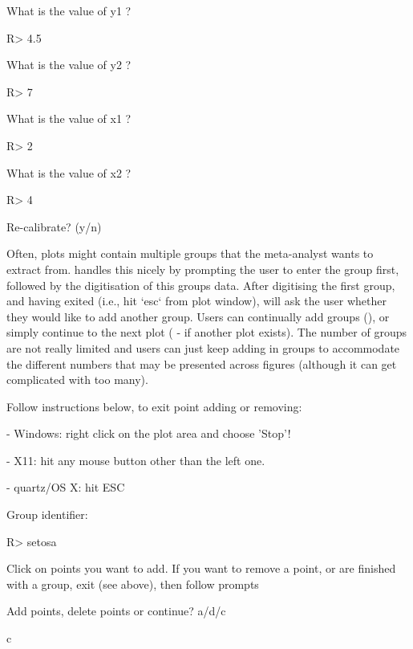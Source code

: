 \documentclass[article]{jss}
\newcommand{\fct}[1]{\code{#1()}}
\begin{document}
\begin{CodeChunk}
\begin{CodeOutput}
What is the value of y1 ?
\end{CodeOutput}
\begin{CodeInput}
R> 4.5
\end{CodeInput}
\begin{CodeOutput}
What is the value of y2 ?
\end{CodeOutput}
\begin{CodeInput}
R> 7
\end{CodeInput}
\begin{CodeOutput}
What is the value of x1 ?
\end{CodeOutput}
\begin{CodeInput}
R> 2
\end{CodeInput}
\begin{CodeOutput}
What is the value of x2 ?
\end{CodeOutput}
\begin{CodeInput}
R> 4
\end{CodeInput}
\begin{CodeOutput}
Re-calibrate? (y/n) 
\end{CodeOutput}
\end{CodeChunk}

Often, plots might contain multiple groups that the meta-analyst wants to extract from. \fct{metaDigitise} handles this nicely by prompting the user to enter the group first, followed by the digitisation of this groups data. After digitising the first group, and having exited (i.e., hit `esc` from plot window), \fct{metaDigitise} will ask the user whether they would like to add another group. Users can continually add groups (), or simply continue to the next plot ( - if another plot exists). 
The number of groups are not really limited and users can just keep adding in groups to accommodate the different numbers that may be presented across figures (although it can get complicated with too many).

\begin{CodeChunk}
\begin{CodeOutput}
Follow instructions below, to exit point adding or removing:

 - Windows: right click on the plot area and choose 'Stop'!

 - X11: hit any mouse button other than the left one.

 - quartz/OS X: hit ESC

Group identifier:
\end{CodeOutput}
\begin{CodeInput}
R> setosa
\end{CodeInput}
\begin{CodeOutput}
Click on points you want to add.
If you want to remove a point, or are finished with a
group, exit (see above), then follow prompts

Add points, delete points or continue? a/d/c 
\end{CodeOutput}
\begin{CodeInput}
c
\end{CodeInput}
\end{CodeChunk}
\end{document}
